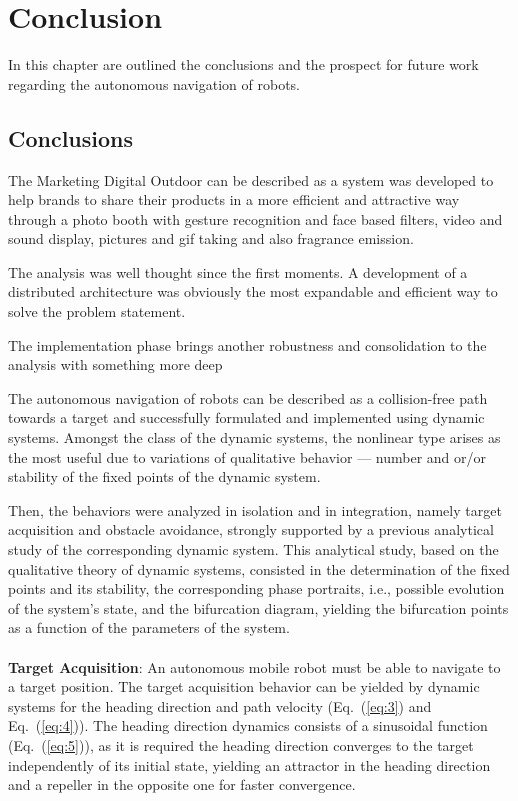 \chapter{Conclusion}%
\label{ch:conclusion}
In this chapter are outlined the conclusions and the prospect for future work
regarding the autonomous navigation of robots.
%
\section{Conclusions}%
\label{ch:conclusion-concls}
The Marketing Digital Outdoor can be described as a system was developed to help brands to share their products in a more efficient and attractive way through a photo booth with gesture recognition and face based filters, video and sound display, pictures and gif taking and also fragrance emission.

The analysis was well thought since the first moments. A development of a distributed architecture was obviously the most expandable and efficient way to solve the problem statement.

The implementation phase brings another robustness and consolidation to the analysis with something more deep 

The autonomous navigation of robots can be described as a collision-free path
towards a target and successfully formulated and implemented using dynamic
systems. Amongst the class of the dynamic systems, the nonlinear type arises as
the most useful due to variations of qualitative behavior --- number and or/or
stability of the fixed points of the dynamic system. 

Then, the behaviors were analyzed in isolation and in integration, namely target
acquisition and obstacle avoidance, strongly supported by a previous analytical
study of the corresponding dynamic system. This analytical study, based on the
qualitative theory of dynamic systems, consisted in the determination of the
fixed points and its stability, the corresponding phase portraits, i.e.,
possible evolution of the system's state, and the bifurcation diagram, yielding
the bifurcation points as a function of the parameters of the system.
\\\\
\textbf{Target Acquisition}: An autonomous mobile robot must be able to navigate to a target position. The
target acquisition behavior can be yielded by dynamic systems for the heading
direction and path velocity (Eq.~(\ref{eq:3}) and Eq.~(\ref{eq:4})). The heading direction dynamics consists of a
sinusoidal function (Eq.~(\ref{eq:5})), as it is required the heading direction
converges to the target independently of its initial state, yielding an attractor in the heading direction and a
repeller in the opposite one for faster convergence. 

